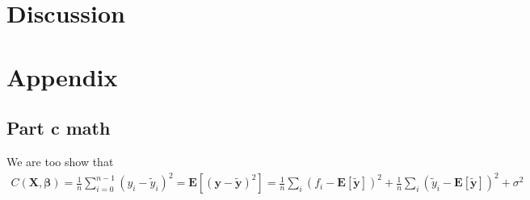 \documentclass[a4paper,10pt,english]{article}
\begin{document}
\section{Discussion}
\label{sec:discussion}

\newpage

\section{Appendix}
\label{sec:appendix}
	
\subsection{Part c math}

We are too show that 
\begin{align}
C(\boldsymbol{X}, \boldsymbol{\beta})=\frac{1}{n} \sum_{i=0}^{n-1}\left(y_{i}-\tilde{y}_{i}\right)^{2}
= \mathbf{E}\left[(\boldsymbol{y}-\tilde{\boldsymbol{y}})^{2}\right]
=\frac{1}{n} \sum_{i}\left(f_{i}-\mathbf{E}[\tilde{\boldsymbol{y}}]\right)^{2}+\frac{1}{n} \sum_{i}\left(\tilde{y}_{i}-\mathbf{E}[\tilde{\boldsymbol{y}}]\right)^{2}+\sigma^{2}
\end{align}
\end{document}
